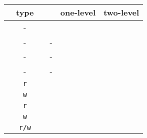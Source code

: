 \begin{figure}[!t]
\centering
{\footnotesize
  \begin{tabular}{l| ccrrr}
  \whline
                                        & type
                                        & 
                                        & \dgemm{}
                                        & one-level 
                                        & two-level  \\
\hline
                        & -
                                        & 
                                        & 
                                        & 
                                        &  \\
                           & -
                                        & 
                                        & -
                                        & 
                                        &  \\
                             & -
                                        & 
                                        & -
                                        & 
                                        &  \\
                             & -
                                        & 
                                        & -
                                        & 
                                        &  \\
  \hline
                    & \texttt{r}
                                        & 
                                        & 
                                        & 
                                        &  \\
       & \texttt{w}
                                        & 
                                        & 
                                        & 
                                        &  \\
                    & \texttt{r}
                                        & 
                                        & 
                                        & 
                                        &  \\
         & \texttt{w}
                                        & 
                                        & 
                                        & 
                                        &  \\
   \fromto{}{(*)}                 & \texttt{r/w}
                                        & 
                                        & 
                                        & 

\end{tabular}}
\end{figure}
